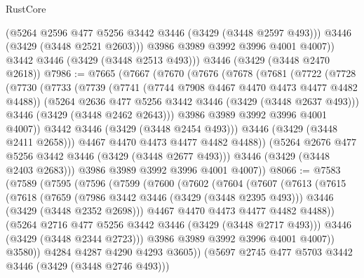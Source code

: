 \begin{lexlean}{RustCore}
\begin{coremodule}
            (@5264 @2596 @477 @5256 @3442 @3446 (@3429 (@3448 @2597 @493)))
            @3446
            (@3429 (@3448 @2521 @2603)))
          @3986
          @3989
          @3992
          @3996
          @4001
          @4007))
      @3442
      @3446
      (@3429 (@3448 @2513 @493)))
    @3446
    (@3429 (@3448 @2470 @2618))
@7986 := @7665
    (@7667
      (@7670
        (@7676
          (@7678
            (@7681
              (@7722
                (@7728
                  (@7730
                    (@7733
                      (@7739
                        (@7741 (@7744 @7908 @4467 @4470 @4473 @4477 @4482 @4488))
                        (@5264 @2636 @477 @5256 @3442 @3446 (@3429 (@3448 @2637 @493)))
                        @3446
                        (@3429 (@3448 @2462 @2643)))
                      @3986
                      @3989
                      @3992
                      @3996
                      @4001
                      @4007))
                  @3442
                  @3446
                  (@3429 (@3448 @2454 @493)))
                @3446
                (@3429 (@3448 @2411 @2658)))
              @4467
              @4470
              @4473
              @4477
              @4482
              @4488))
          (@5264 @2676 @477 @5256 @3442 @3446 (@3429 (@3448 @2677 @493)))
          @3446
          (@3429 (@3448 @2403 @2683)))
        @3986
        @3989
        @3992
        @3996
        @4001
        @4007))
@8066 := @7583
    (@7589
      (@7595
        (@7596
          (@7599
            (@7600
              (@7602
                (@7604
                  (@7607
                    (@7613
                      (@7615
                        (@7618
                          (@7659
                            (@7986 @3442 @3446 (@3429 (@3448 @2395 @493)))
                            @3446
                            (@3429 (@3448 @2352 @2698)))
                          @4467
                          @4470
                          @4473
                          @4477
                          @4482
                          @4488))
                      (@5264 @2716 @477 @5256 @3442 @3446 (@3429 (@3448 @2717 @493)))
                      @3446
                      (@3429 (@3448 @2344 @2723)))
                    @3986
                    @3989
                    @3992
                    @3996
                    @4001
                    @4007))
                @3580))
            @4284
            @4287
            @4290
            @4293
            @3605))
        (@5697 @2745 @477 @5703 @3442 @3446 (@3429 (@3448 @2746 @493)))

\end{coremodule}
\end{lexlean}
